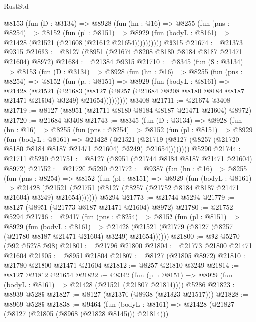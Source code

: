 \begin{lexlean}{RustStd}
\begin{coremodule}
      @8153
        (fun (D : @3134) =>
        @8928
          (fun (hn : @16) =>
          @8255
            (fun (pns : @8254) =>
            @8152
              (fun (pl : @8151) =>
              @8929 (fun (bodyL : @8161) => @21428 (@21521 (@21608 (@21612 @21654))))))))))
    @9315
@21674 := @21373 @9315
@21683 := @8127 (@8951 (@21674 @8208 @8180 @8184 @8187 @21471 @21604) @8972)
@21684 := @21384 @9315
@21710 := @8345
    (fun (S : @3134) =>
    @8153
      (fun (D : @3134) =>
      @8928
        (fun (hn : @16) =>
        @8255
          (fun (pns : @8254) =>
          @8152
            (fun (pl : @8151) =>
            @8929
              (fun (bodyL : @8161) =>
              @21428
                (@21521
                  (@21683
                    (@8127
                      (@8257 (@21684 @8208 @8180 @8184 @8187 @21471 @21604) @3249)
                      @21654)))))))))
    @3408
@21711 := @21674 @3408
@21719 := @8127 (@8951 (@21711 @8180 @8184 @8187 @21471 @21604) @8972)
@21720 := @21684 @3408
@21743 := @8345
    (fun (D : @3134) =>
    @8928
      (fun (hn : @16) =>
      @8255
        (fun (pns : @8254) =>
        @8152
          (fun (pl : @8151) =>
          @8929
            (fun (bodyL : @8161) =>
            @21428
              (@21521
                (@21719 (@8127 (@8257 (@21720 @8180 @8184 @8187 @21471 @21604) @3249) @21654))))))))
    @5290
@21744 := @21711 @5290
@21751 := @8127 (@8951 (@21744 @8184 @8187 @21471 @21604) @8972)
@21752 := @21720 @5290
@21772 := @9387
    (fun (hn : @16) =>
    @8255
      (fun (pns : @8254) =>
      @8152
        (fun (pl : @8151) =>
        @8929
          (fun (bodyL : @8161) =>
          @21428
            (@21521 (@21751 (@8127 (@8257 (@21752 @8184 @8187 @21471 @21604) @3249) @21654)))))))
    @5294
@21773 := @21744 @5294
@21779 := @8127 (@8951 (@21773 @8187 @21471 @21604) @8972)
@21780 := @21752 @5294
@21796 := @9417
    (fun (pns : @8254) =>
    @8152
      (fun (pl : @8151) =>
      @8929
        (fun (bodyL : @8161) =>
        @21428 (@21521 (@21779 (@8127 (@8257 (@21780 @8187 @21471 @21604) @3249) @21654))))))
@21800 := @92 @5270 (@92 @5278 @98)
@21801 := @21796 @21800
@21804 := @21773 @21800 @21471 @21604
@21805 := @8951 @21804
@21807 := @8127 (@21805 @8972)
@21810 := @21780 @21800 @21471 @21604
@21812 := @8257 @21810 @3249
@21814 := @8127 @21812 @21654
@21822 := @8342
    (fun (pl : @8151) => @8929 (fun (bodyL : @8161) => @21428 (@21521 (@21807 @21814))))
    @5286
@21823 := @8939 @5286
@21827 := @8127 (@21370 (@8938 (@21823 @21517)))
@21828 := @8969 @5286
@21838 := @9464
    (fun (bodyL : @8161) => @21428 (@21827 (@8127 (@21805 (@8968 (@21828 @8145))) @21814)))

\end{coremodule}
\end{lexlean}
